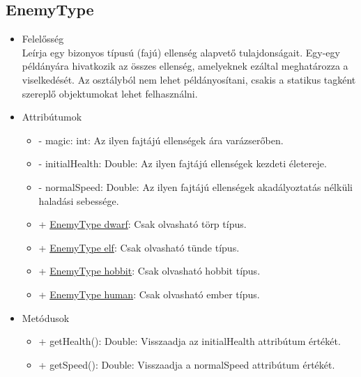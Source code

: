 \subsection{EnemyType}
\begin{itemize}
\item Felelősség\\
Leírja egy bizonyos típusú (fajú) ellenség alapvető tulajdonságait. Egy-egy példányára hivatkozik az összes ellenség, amelyeknek ezáltal meghatározza a viselkedését. Az osztályból nem lehet példányosítani, csakis a statikus tagként szereplő objektumokat lehet felhasználni.
\item Attribútumok
	\begin{itemize}
		\item - magic: int: Az ilyen fajtájú ellenségek ára varázserőben.
		\item - initialHealth: Double: Az ilyen fajtájú ellenségek kezdeti életereje.
		\item - normalSpeed: Double: Az ilyen fajtájú ellenségek akadályoztatás nélküli haladási sebessége.
		\item + \underline{EnemyType dwarf}: Csak olvasható törp típus.
		\item + \underline{EnemyType elf}: Csak olvasható tünde típus.
		\item + \underline{EnemyType hobbit}: Csak olvasható hobbit típus.
		\item + \underline{EnemyType human}: Csak olvasható ember típus.
	\end{itemize}
\item Metódusok
	\begin{itemize}
		\item + getHealth(): Double: Visszaadja az initialHealth attribútum értékét.
		\item + getSpeed(): Double: Visszaadja a normalSpeed attribútum értékét.
	\end{itemize}
\end{itemize}

